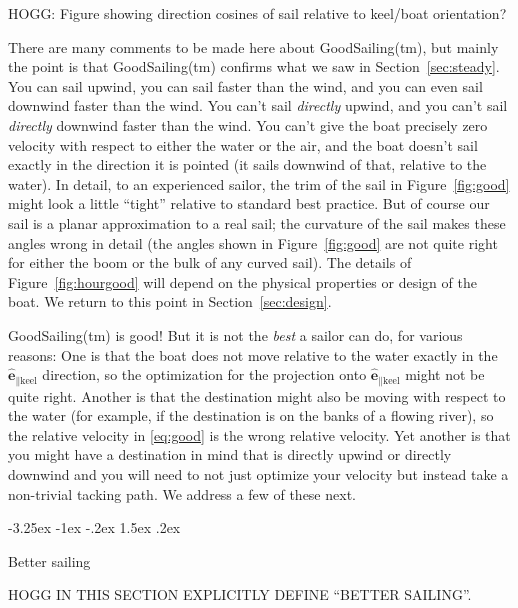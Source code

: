 \documentclass[letterpaper]{article}
\makeatletter
\renewcommand{\vec}[1]{\boldsymbol{#1}}
\newcommand{\uvec}{\vec{\hat{e}}}
\newcommand{\keel}{\text{keel}}
\newcommand{\secref}[1]{Section~\ref{#1}}
\newcommand{\figref}[1]{Figure~\ref{#1}}
\renewcommand\section{\@startsection {section}{1}{\z@}%
  {-3.25ex \@plus -1ex \@minus -.2ex}%
  {1.5ex \@plus .2ex}%
  {\raggedright\normalfont\large\bfseries}}
\makeatother
\begin{document}
HOGG: Figure showing direction cosines of sail relative to keel/boat orientation?

There are many comments to be made here about GoodSailing(tm), but mainly the point is that GoodSailing(tm) confirms what we saw in \secref{sec:steady}.
You can sail upwind, you can sail faster than the wind, and you can even sail downwind faster than the wind.
You can't sail \emph{directly} upwind, and you can't sail \emph{directly} downwind faster than the wind.
You can't give the boat precisely zero velocity with respect to either the water or the air, and the boat doesn't sail exactly in the direction it is pointed (it sails downwind of that, relative to the water).
In detail, to an experienced sailor, the trim of the sail in \figref{fig:good} might look a little ``tight'' relative to standard best practice.
But of course our sail is a planar approximation to a real sail; the curvature of the sail makes these angles wrong in detail (the angles shown in \figref{fig:good} are not quite right for either the boom or the bulk of any curved sail).
The details of \figref{fig:hourgood} will depend on the physical properties or design of the boat.
We return to this point in \secref{sec:design}.

GoodSailing(tm) is good!
But it is not the \emph{best} a sailor can do, for various reasons:
One is that the boat does not move relative to the water exactly in the $\uvec_{\parallel\keel}$ direction, so the optimization for the projection onto $\uvec_{\parallel\keel}$ might not be quite right.
Another is that the destination might also be moving with respect to the water (for example, if the destination is on the banks of a flowing river), so the relative velocity in \eqref{eq:good} is the wrong relative velocity.
Yet another is that you might have a destination in mind that is directly upwind or directly downwind and you will need to not just optimize your velocity but instead take a non-trivial tacking path.
We address a few of these next.

\section{Better sailing}\label{sec:better}

HOGG IN THIS SECTION EXPLICITLY DEFINE ``BETTER SAILING''.
\end{document}
